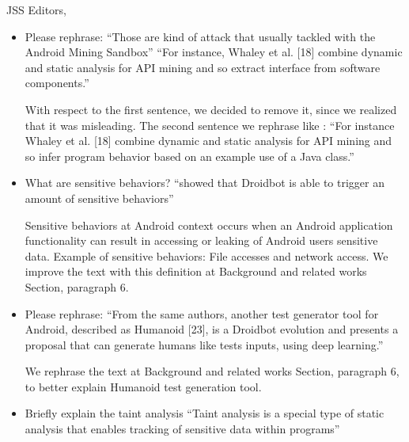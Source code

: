 \documentclass{letter}
\begin{document}
\begin{letter}{JSS Editors,}
\begin{itemize}
\vspace{0.2cm}

\item Please rephrase:
``Those are kind of attack that usually tackled with the Android Mining Sandbox''
``For instance, Whaley et al. [18] combine dynamic and static analysis for API mining and so extract interface from software components.''


\vspace{0.2cm}

{\color{blue}{\bf Answer:} With respect to the first sentence, we decided to remove it, since we realized that it was misleading. The second sentence we rephrase like : ``For instance Whaley et al. [18] combine dynamic and static analysis for API mining and so infer program behavior based on an example use of a Java class.''}

\vspace{0.2cm}

\item What are sensitive behaviors? ``showed that Droidbot is able to trigger an amount of sensitive behaviors''


\vspace{0.2cm}

{\color{blue}{\bf Answer:} Sensitive behaviors at Android context occurs when  an Android application functionality can result in accessing or leaking of Android users sensitive data. Example of sensitive behaviors: File accesses and network access. We improve the text with this definition at Background and related works Section, paragraph 6.}

\vspace{0.2cm}

\item Please rephrase:
``From the same authors, another test generator tool for Android, described as Humanoid [23], is a Droidbot evolution and
presents a proposal that can generate humans like tests inputs, using deep learning.''


\vspace{0.2cm}

{\color{blue}{\bf Answer:} We rephrase the text at Background and related works Section, paragraph 6, to better explain Humanoid test generation tool.}

\vspace{0.2cm}

\item Briefly explain the taint analysis
``Taint analysis is a special type of static analysis that enables tracking of sensitive data within programs''



\end{itemize}
\end{letter}
\end{document}
